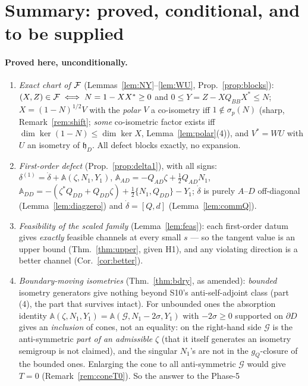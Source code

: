 \documentclass[11pt]{article}
\newcommand{\hh}{\mathfrak h}
\newcommand{\Aop}{\mathbb A}
\begin{document}
\section{Summary: proved, conditional, and to be supplied}\label{sec:summary}


\paragraph{Proved here, unconditionally.}
\begin{enumerate}[leftmargin=1.8em,itemsep=1pt]
\item \emph{Exact chart of $\mathcal F$} (Lemmas~\ref{lem:NY}--\ref{lem:WU},
 Prop.~\ref{prop:blocks}): $(X,Z)\in\mathcal F\iff N=1-XX^*\ge0$ and $0\le Y=Z-XQ_{BB}X^*\le N$;
 $X=(1-N)^{1/2}V$ with the \emph{polar} $V$ a co-isometry iff $1\notin\sigma_p(N)$ (sharp,
 Remark~\ref{rem:shift}; \emph{some} co-isometric factor exists iff
 $\dim\ker(1-N)\le\dim\ker X$, Lemma~\ref{lem:polar}(4)), and $V^*=WU$ with $U$ an isometry
 of $\hh_D$.  All defect blocks exactly, no expansion.
\item \emph{First-order defect} (Prop.~\ref{prop:delta1}), with all signs:
 $\delta^{(1)}=\dot\delta+\Aop(\zeta,N_1,Y_1)$, $\Aop_{AD}=-Q_{AD}\zeta+\frac12Q_{AD}N_1$,
 $\Aop_{DD}=-(\zeta^*Q_{DD}+Q_{DD}\zeta)+\frac12\{N_1,Q_{DD}\}-Y_1$; $\dot\delta$ is purely
 $A$--$D$ off-diagonal (Lemma~\ref{lem:diagzero}) and $\dot\delta=[Q,d]$
 (Lemma~\ref{lem:commQ}).
\item \emph{Feasibility of the scaled family} (Lemma~\ref{lem:feas}): each first-order
 datum gives \emph{exactly} feasible channels at every small $s$ --- so the tangent value
 is an upper bound (Thm.~\ref{thm:upper}, given H1), and any violating direction is a
 better channel (Cor.~\ref{cor:better}).
\item \emph{Boundary-moving isometries} (Thm.~\ref{thm:bdry}, as amended): \emph{bounded}
 isometry generators give nothing beyond S10's anti-self-adjoint class (part (4), the part
 that survives intact).  For unbounded ones the absorption identity
 $\Aop(\zeta,N_1,Y_1)=\Aop(\mathcal G,N_1-2\sigma,Y_1)$ with $-2\sigma\ge0$ supported on
 $\partial D$ gives an \emph{inclusion} of cones, not an equality: on the right-hand side
 $\mathcal G$ is the anti-symmetric \emph{part of an admissible} $\zeta$ (that it itself
 generates an isometry semigroup is not claimed), and the singular $N_1$'s are not in the
 $g_Q$-closure of the bounded ones.  Enlarging the cone to all anti-symmetric
 $\mathcal G$ would give $T=0$ (Remark~\ref{rem:coneT0}).  So the answer to the Phase-5

\end{enumerate}
\end{document}
